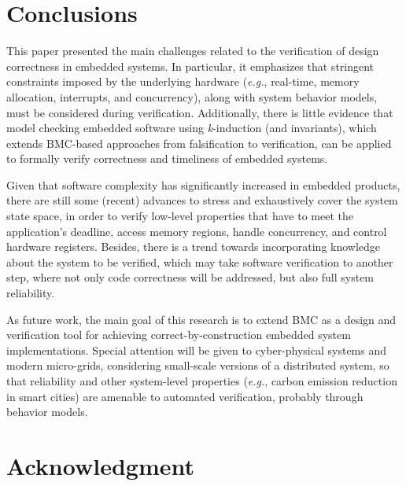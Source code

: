 \documentclass{acm_sen_article}
\begin{document}


\section{Conclusions}
\label{conclusions}

This paper presented the main challenges related to the verification of design correctness in embedded systems. In particular, it emphasizes that stringent constraints imposed by the underlying hardware ({\it e.g.}, real-time, memory allocation, interrupts, and concurrency), along with system behavior models, must be considered during verification. Additionally, there is little evidence that model checking embedded software using \textit{k}-induction (and invariants), which
extends BMC-based approaches from falsification to verification, can be applied to formally verify correctness and timeliness of embedded systems. 

Given that software complexity has significantly increased in embedded products, there are still some (recent) advances to stress and exhaustively cover the system state space, in order to verify low-level properties that have to meet the application's deadline, access memory regions, handle concurrency, and control hardware registers. Besides, there is a trend towards incorporating knowledge about the system to be verified, which may take software verification to another step, where not only code correctness will be addressed, but also full system reliability. 

As future work, the main goal of this research is to extend BMC as a design and verification tool for achieving correct-by-construction embedded system implementations. Special attention will be given to cyber-physical systems and modern micro-grids, considering small-scale versions of a distributed system, so that reliability and other system-level properties ({\it e.g.}, carbon emission reduction in smart cities) are amenable to automated verification, probably through behavior models.





\section*{Acknowledgment}
\end{document}
